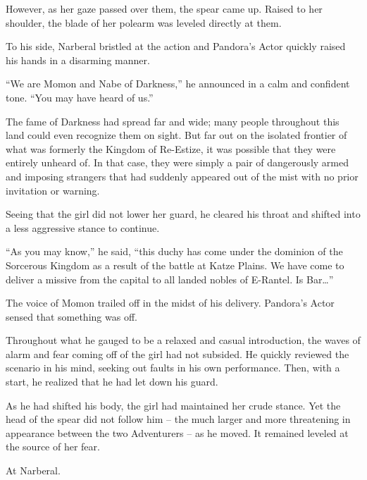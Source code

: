  

However, as her gaze passed over them, the spear came up. Raised to her shoulder, the blade of her polearm was leveled directly at them.

 

To his side, Narberal bristled at the action and Pandora’s Actor quickly raised his hands in a disarming manner.

 

“We are Momon and Nabe of Darkness,” he announced in a calm and confident tone. “You may have heard of us.”

 

The fame of Darkness had spread far and wide; many people throughout this land could even recognize them on sight. But far out on the isolated frontier of what was formerly the Kingdom of Re-Estize, it was possible that they were entirely unheard of. In that case, they were simply a pair of dangerously armed and imposing strangers that had suddenly appeared out of the mist with no prior invitation or warning.

 

Seeing that the girl did not lower her guard, he cleared his throat and shifted into a less aggressive stance to continue.

 

“As you may know,” he said, “this duchy has come under the dominion of the Sorcerous Kingdom as a result of the battle at Katze Plains. We have come to deliver a missive from the capital to all landed nobles of E-Rantel. Is Bar…”

 

The voice of Momon trailed off in the midst of his delivery. Pandora’s Actor sensed that something was off.

 

Throughout what he gauged to be a relaxed and casual introduction, the waves of alarm and fear coming off of the girl had not subsided. He quickly reviewed the scenario in his mind, seeking out faults in his own performance. Then, with a start, he realized that he had let down his guard.

 

As he had shifted his body, the girl had maintained her crude stance. Yet the head of the spear did not follow him – the much larger and more threatening in appearance between the two Adventurers – as he moved. It remained leveled at the source of her fear.

 

At Narberal.

